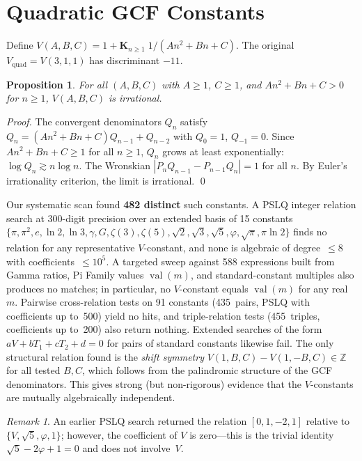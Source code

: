 \documentclass[11pt,a4paper]{article}
\newtheorem{proposition}[theorem]{Proposition}
\theoremstyle{definition}
\theoremstyle{remark}
\newtheorem{remark}[theorem]{Remark}
\begin{document}
\section{Quadratic GCF Constants}\label{sec:vquad}

Define $V(A,B,C) = 1 + \mathbf{K}_{n \ge 1}\; 1/(An^2 + Bn + C)$.
The original $V_{\text{quad}} = V(3,1,1)$ has discriminant $-11$.

\begin{proposition}
For all $(A,B,C)$ with $A \ge 1$, $C \ge 1$, and $An^2 + Bn + C > 0$ for $n \ge 1$,
$V(A,B,C)$ is irrational.
\end{proposition}

\begin{proof}
The convergent denominators $Q_n$ satisfy $Q_n = (An^2+Bn+C)Q_{n-1} + Q_{n-2}$
with $Q_0 = 1$, $Q_{-1} = 0$. Since $An^2+Bn+C \ge 1$ for all $n \ge 1$,
$Q_n$ grows at least exponentially: $\log Q_n \gtrsim n \log n$.
The Wronskian $|P_n Q_{n-1} - P_{n-1} Q_n| = 1$ for all $n$.
By Euler's irrationality criterion, the limit is irrational. \qed
\end{proof}

\noindent
Our systematic scan found \textbf{482 distinct} such constants. A PSLQ integer
relation search at 300-digit precision over an extended basis of 15 constants
$\{\pi, \pi^2, e, \ln 2, \ln 3, \gamma, G, \zeta(3), \zeta(5),
\sqrt{2}, \sqrt{3}, \sqrt{5}, \varphi, \sqrt{\pi}, \pi\ln 2\}$
finds no relation for any representative $V$-constant, and none is algebraic
of degree~$\le 8$ with coefficients~$\le 10^5$.
A targeted sweep against 588 expressions built from Gamma ratios, Pi Family
values $\operatorname{val}(m)$, and standard-constant multiples also produces
no matches; in particular, no $V$-constant equals $\operatorname{val}(m)$ for
any real~$m$.
Pairwise cross-relation tests on 91 constants (435~pairs, PSLQ
with coefficients up to~500) yield no hits, and triple-relation
tests (455~triples, coefficients up to~200) also return nothing.
Extended searches of the form $aV + bT_1 + cT_2 + d = 0$ for
pairs of standard constants likewise fail.
The only structural relation found is the {\em shift symmetry\/}
$V(1,B,C) - V(1,-B,C) \in \mathbb{Z}$ for all tested $B, C$,
which follows from the palindromic structure of the GCF denominators.
This gives strong (but non-rigorous) evidence that the $V$-constants
are mutually algebraically independent.

\begin{remark}
An earlier PSLQ search returned the relation $[0, 1, -2, 1]$ relative to
$\{V, \sqrt{5}, \varphi, 1\}$; however, the coefficient of $V$ is zero---this is
the trivial identity $\sqrt{5} - 2\varphi + 1 = 0$ and does not involve~$V$.
\end{remark}
\end{document}
